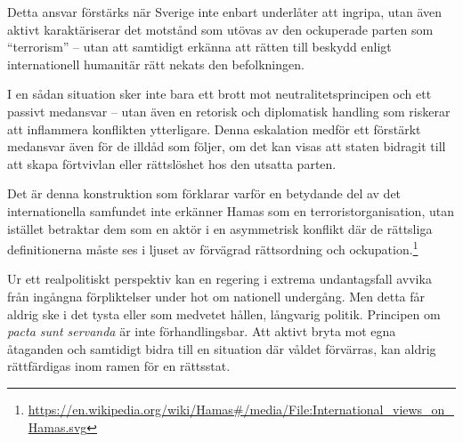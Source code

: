 Detta ansvar förstärks när Sverige inte enbart underlåter att ingripa, utan även aktivt karaktäriserar det motstånd som utövas av den ockuperade parten som ``terrorism'' – utan att samtidigt erkänna att rätten till beskydd enligt internationell humanitär rätt nekats den befolkningen.

I en sådan situation sker inte bara ett brott mot neutralitetsprincipen och ett passivt medansvar – utan även en retorisk och diplomatisk handling som riskerar att inflammera konflikten ytterligare. Denna eskalation medför ett förstärkt medansvar även för de illdåd som följer, om det kan visas att staten bidragit till att skapa förtvivlan eller rättslöshet hos den utsatta parten.




Det är denna konstruktion som förklarar varför en betydande del av det internationella samfundet inte erkänner Hamas som en terroristorganisation, utan istället betraktar dem som en aktör i en asymmetrisk konflikt där de rättsliga definitionerna måste ses i ljuset av förvägrad rättsordning och ockupation.\footnote{\url{https://en.wikipedia.org/wiki/Hamas\#/media/File:International_views_on_Hamas.svg}}

Ur ett realpolitiskt perspektiv kan en regering i extrema undantagsfall avvika från ingångna förpliktelser under hot om nationell undergång. Men detta får aldrig ske i det tysta eller som medvetet hållen, långvarig politik. Principen om \textit{pacta sunt servanda} är inte förhandlingsbar. Att aktivt bryta mot egna åtaganden och samtidigt bidra till en situation där våldet förvärras, kan aldrig rättfärdigas inom ramen för en rättsstat.

